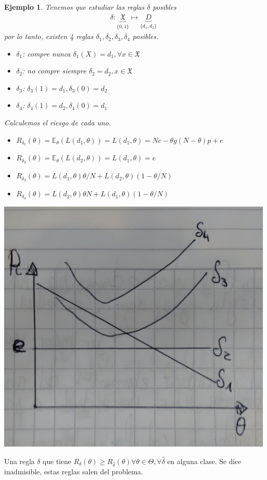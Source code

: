 \documentclass[10pt]{article}
\theoremstyle{plain}
\newtheorem{ej}{Ejemplo}
\theoremstyle{definition}
\begin{document}
\begin{ej}
Tenemos que estudiar las reglas $\delta$ posibles
\begin{align*}
\delta \colon \underbrace{\mathfrak{X}}_{\{0,1\}} \mapsto \underbrace{D}_{\{d_{1},d_{2}\}}
\end{align*}
por lo tanto, existen 4 reglas $\delta_{1}, \delta_{2}, \delta_{3}, \delta_{4}$ posibles.
\begin{itemize}
\item $\delta_{1}$: compre nunca $\delta_{1}(X) = d_{1}, \forall x\in\mathfrak{X}$
\item $\delta_{2}$: no compre siempre $\delta_{2} = d_{2}, x\in\mathfrak{X}$
\item $\delta_{3}$: $\delta_{3}(1) = d_{1}, \delta_{3}(0) = d_{2}$
\item $\delta_{4}$: $\delta_{4}(1) = d_{2}, \delta_{4}(0) = d_{1}$
\end{itemize}
Calculemos el riesgo de cada uno.
\begin{itemize}
\item $R_{\delta_{1}}(\theta) = \mathbb{E}_{\theta}(L(d_{1},\theta)) = L(d_{1},\theta) = Nc-\theta g (N-\theta)p + e$
\item $R_{\delta_{2}}(\theta) = \mathbb{E}_{\theta}(L(d_{2},\theta)) = L(d_{1},\theta) = e$
\item $R_{\delta_{3}}(\theta) = L(d_{1},\theta)\theta/N + L(d_{2},\theta) \left(1-\theta/N\right)$
\item $R_{\delta_{4}}(\theta) = L(d_{2},\theta)\theta N + L(d_{1},\theta) \left(1-\theta/N\right)$
\end{itemize}
\begin{center}
\includegraphics[scale=0.1]{imagenes/riesgo.jpg}
\end{center}
\end{ej}
Una regla $\delta$ que tiene $R_{\delta}(\theta) \ge  R_{\hat{\delta}}(\theta) \forall \theta \in \Theta, \forall \hat{\delta}$ en alguna clase. Se dice inadmisible, estas reglas salen del problema.\\
\end{document}
